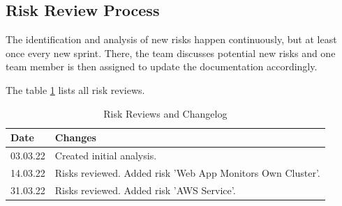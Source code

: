 \subsection{Risk Review Process}
The identification and analysis of new risks happen continuously, but at least once every new sprint. There, the team discusses potential new risks and one team member is then assigned to update the documentation accordingly.

The table \ref{tab:risk-review} lists all risk reviews.

\begin{table}[h!]
\centering
  \caption{\label{tab:risk-review}Risk Reviews and Changelog}
  \begin{tabular}{ | l | l | }
    \hline
    \textbf{Date} & \textbf{Changes} \\
    \hline
    03.03.22 & Created initial analysis. \\
    \hline
    14.03.22 & Risks reviewed. Added risk 'Web App Monitors Own Cluster'. \\
    \hline
    31.03.22 & Risks reviewed. Added risk 'AWS Service'. \\
    \hline
  \end{tabular}
\end{table}



